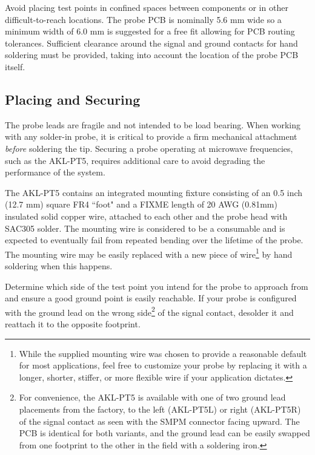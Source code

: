 \documentclass[11pt]{article}
\begin{document}
Avoid placing test points in confined spaces between components or in other difficult-to-reach locations. The probe PCB
is nominally 5.6 mm wide so a minimum width of 6.0 mm is suggested for a free fit allowing for PCB routing tolerances.
Sufficient clearance around the signal and ground contacts for hand soldering must be provided, taking into account the
location of the probe PCB itself.


\subsection{Placing and Securing}

The probe leads are fragile and not intended to be load bearing. When working with any solder-in probe, it is critical
to provide a firm mechanical attachment \emph{before} soldering the tip. Securing a probe operating at microwave
frequencies, such as the AKL-PT5, requires additional care to avoid degrading the performance of the system.

The AKL-PT5 contains an integrated mounting fixture consisting of an 0.5 inch (12.7 mm) square FR4 ``foot" and a FIXME
length of 20 AWG (0.81mm) insulated solid copper wire, attached to each other and the probe head with SAC305 solder.
The mounting wire is considered to be a consumable and is expected to eventually fail from repeated bending over the
lifetime of the probe. The mounting wire may be easily replaced with a new piece of wire\footnote{While the supplied
mounting wire was chosen to provide a reasonable default for most applications, feel free to customize your probe by
replacing it with a longer, shorter, stiffer, or more flexible wire if your application dictates.} by hand soldering
when this happens.

Determine which side of the test point you intend for the probe to approach from and ensure a good ground point is
easily reachable. If your probe is configured with the ground lead on the wrong side\footnote{For convenience, the
AKL-PT5 is available with one of two ground lead placements from the factory, to the left (AKL-PT5L) or right
(AKL-PT5R) of the signal contact as seen with the SMPM connector facing upward. The PCB is identical for both variants,
and the ground lead can be easily swapped from one footprint to the other in the field with a soldering iron.} of the
signal contact, desolder it and reattach it to the opposite footprint.
\end{document}
